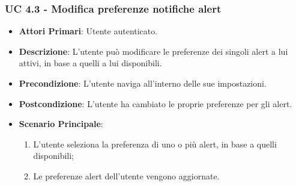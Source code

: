 			\subsubsection{UC 4.3 - Modifica preferenze notifiche alert}
			\begin{itemize}
				\item \textbf{Attori Primari}: Utente autenticato.
				\item \textbf{Descrizione}: L'utente può modificare le preferenze dei singoli alert a lui attivi, in base a quelli a lui disponibili.
				\item \textbf{Precondizione}: L'utente naviga all'interno delle sue impostazioni.
				\item \textbf{Postcondizione}: L'utente ha cambiato le proprie preferenze per gli alert.
				\item \textbf{Scenario Principale}:
				\begin{enumerate}
					\item{L'utente seleziona la preferenza di uno o più alert, in base a quelli disponibili;}
					\item{Le preferenze alert dell'utente vengono aggiornate.}
				\end{enumerate}
			\end{itemize}